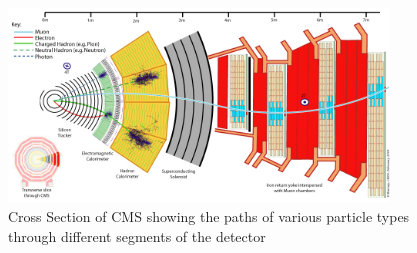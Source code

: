 \begin{figure}
\centering
    \includegraphics[width=0.9\textwidth]{./Figures/detector/CMS_Slice.jpg}
  \caption{Cross Section of CMS showing the paths of various particle types 
  through different segments of the detector \cite{cmsslice}}
  \label{CMS_SLICE}
\end{figure}

